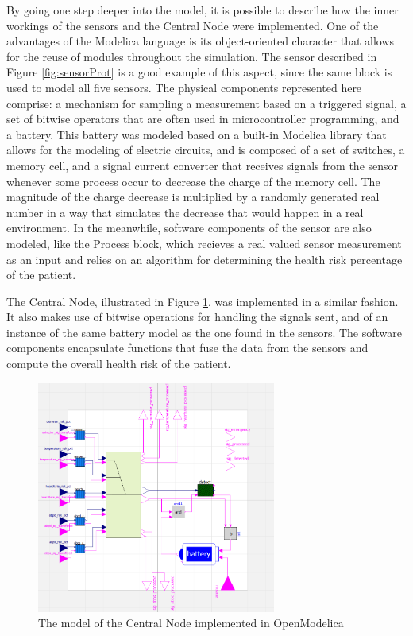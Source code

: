 By going one step deeper into the model, it is possible to describe how the inner workings of the sensors and the Central Node were implemented. One of the advantages of the Modelica language is its object-oriented character that allows for the reuse of modules throughout the simulation. The sensor described in Figure \ref{fig:sensorProt} is a good example of this aspect, since the same block is used to model all five sensors. The physical components represented here comprise: a mechanism for sampling a measurement based on a triggered signal, a set of bitwise operators that are often used in microcontroller programming, and a battery. This battery was modeled based on a built-in Modelica library that allows for the modeling of electric circuits, and is composed of a set of switches, a memory cell, and a signal current converter that receives signals from the sensor whenever some process occur to decrease the charge of the memory cell. The magnitude of the charge decrease is multiplied by a randomly generated real number in a way that simulates the decrease that would happen in a real environment. In the meanwhile, software components of the sensor are also modeled, like the Process block, which recieves a real valued sensor measurement as an input and relies on an algorithm for determining the health risk percentage of the patient.


The Central Node, illustrated in Figure \ref{fig:centralNodeProt}, was implemented in a similar fashion. It also makes use of bitwise operations for handling the signals sent, and of an instance of the same battery model as the one found in the sensors. The software components encapsulate functions that fuse the data from the sensors and compute the overall health risk of the patient.

\begin{figure}[!h]
	\centering
	\includegraphics[width=0.7\textwidth, keepaspectratio]{img/central_node_modelica.png}
	\caption{The model of the Central Node implemented in OpenModelica}
	\label{fig:centralNodeProt}
\end{figure}

